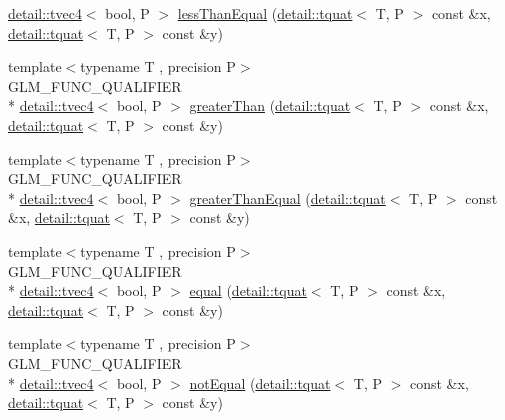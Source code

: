 \begin{DoxyCompactItemize}
\hyperlink{structglm_1_1detail_1_1tvec4}{detail\-::tvec4}$<$ bool, P $>$ \hyperlink{group__gtc__quaternion_ga313fe20896a8cd43c6d08cc88fa18faa}{less\-Than\-Equal} (\hyperlink{structglm_1_1detail_1_1tquat}{detail\-::tquat}$<$ T, P $>$ const \&x, \hyperlink{structglm_1_1detail_1_1tquat}{detail\-::tquat}$<$ T, P $>$ const \&y)
\item 
{\footnotesize template$<$typename T , precision P$>$ }\\G\-L\-M\-\_\-\-F\-U\-N\-C\-\_\-\-Q\-U\-A\-L\-I\-F\-I\-E\-R \\*
\hyperlink{structglm_1_1detail_1_1tvec4}{detail\-::tvec4}$<$ bool, P $>$ \hyperlink{group__gtc__quaternion_ga63be67bccef0b0ad4e60656223ab3761}{greater\-Than} (\hyperlink{structglm_1_1detail_1_1tquat}{detail\-::tquat}$<$ T, P $>$ const \&x, \hyperlink{structglm_1_1detail_1_1tquat}{detail\-::tquat}$<$ T, P $>$ const \&y)
\item 
{\footnotesize template$<$typename T , precision P$>$ }\\G\-L\-M\-\_\-\-F\-U\-N\-C\-\_\-\-Q\-U\-A\-L\-I\-F\-I\-E\-R \\*
\hyperlink{structglm_1_1detail_1_1tvec4}{detail\-::tvec4}$<$ bool, P $>$ \hyperlink{group__gtc__quaternion_gac90d5af34a03cd665a349ac30e4cc44c}{greater\-Than\-Equal} (\hyperlink{structglm_1_1detail_1_1tquat}{detail\-::tquat}$<$ T, P $>$ const \&x, \hyperlink{structglm_1_1detail_1_1tquat}{detail\-::tquat}$<$ T, P $>$ const \&y)
\item 
{\footnotesize template$<$typename T , precision P$>$ }\\G\-L\-M\-\_\-\-F\-U\-N\-C\-\_\-\-Q\-U\-A\-L\-I\-F\-I\-E\-R \\*
\hyperlink{structglm_1_1detail_1_1tvec4}{detail\-::tvec4}$<$ bool, P $>$ \hyperlink{group__gtc__quaternion_ga32ff2cc6fb576639a6237d8d8ed5818b}{equal} (\hyperlink{structglm_1_1detail_1_1tquat}{detail\-::tquat}$<$ T, P $>$ const \&x, \hyperlink{structglm_1_1detail_1_1tquat}{detail\-::tquat}$<$ T, P $>$ const \&y)
\item 
{\footnotesize template$<$typename T , precision P$>$ }\\G\-L\-M\-\_\-\-F\-U\-N\-C\-\_\-\-Q\-U\-A\-L\-I\-F\-I\-E\-R \\*
\hyperlink{structglm_1_1detail_1_1tvec4}{detail\-::tvec4}$<$ bool, P $>$ \hyperlink{group__gtc__quaternion_gaa3a8cf1aa580e435ca96acafbd7870a5}{not\-Equal} (\hyperlink{structglm_1_1detail_1_1tquat}{detail\-::tquat}$<$ T, P $>$ const \&x, \hyperlink{structglm_1_1detail_1_1tquat}{detail\-::tquat}$<$ T, P $>$ const \&y)
\item 

\end{DoxyCompactItemize}

